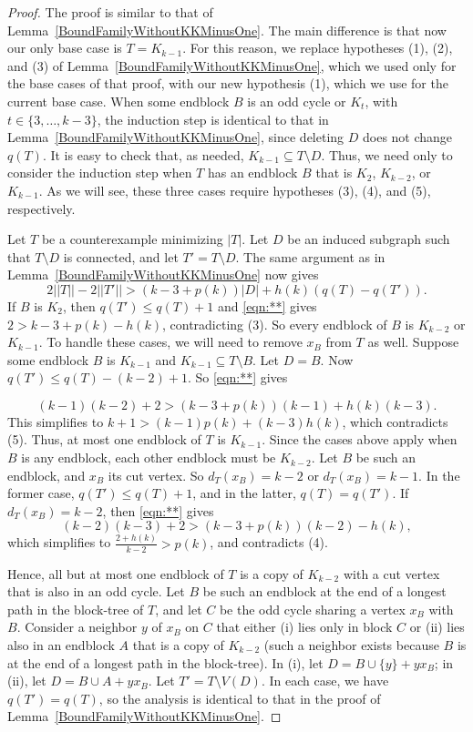\documentclass[12pt]{article}
\theoremstyle{plain}
\theoremstyle{definition}
\theoremstyle{remark}
\newcommand{\card}[1]{\left|#1\right|}
\newcommand{\parens}[1]{\left( #1 \right)}
\begin{document}
\begin{proof}

The proof is similar to that of Lemma~\ref{BoundFamilyWithoutKKMinusOne}.  The
main difference is that now our only base case is $T=K_{k-1}$.  For this
reason, we replace hypotheses (1), (2), and (3) of
Lemma~\ref{BoundFamilyWithoutKKMinusOne}, which we used only for the base cases
of that proof, with our new hypothesis (1), which we use for the current base
case.  When some endblock $B$ is an odd cycle or $K_t$, with $t\in\{3, \ldots,
k-3\}$, the induction step is identical to that in
Lemma~\ref{BoundFamilyWithoutKKMinusOne}, since deleting $D$ does not change
$q(T)$.
It is easy to check that, as needed, $K_{k-1}\subseteq T\setminus D$.  Thus, we
need only to consider the induction step when $T$ has an endblock $B$ that is
$K_2$, $K_{k-2}$, or $K_{k-1}$.  As we will see, these three cases require
hypotheses (3), (4), and (5), respectively.
    
Let $T$ be a counterexample minimizing $|T|$.  Let $D$ be an induced subgraph
such that $T\setminus D$ is connected, and let $T'=T\setminus D$. The same
argument as in Lemma~\ref{BoundFamilyWithoutKKMinusOne} now gives
    \begin{equation}
		2||T||-2||T'|| > (k-3 + p(k))\card{D} + h(k)\parens{q(T) -
q(T')}.\tag{**}\label{eqn:**}
	\end{equation}
If $B$ is $K_2$, then $q(T') \le q(T) + 1$ and \eqref{eqn:**} gives $2 > k-3 +
p(k) - h(k)$, contradicting (3).
So every endblock of $B$ is $K_{k-2}$ or $K_{k-1}$. To handle these cases, we
will need to remove $x_B$ from $T$ as well.  Suppose some endblock $B$ is
$K_{k-1}$ and $K_{k-1} \subseteq T\setminus B$.  Let $D=B$.  Now
$q(T') \le q(T)-(k-2)+1$.  So \eqref{eqn:**} gives
	
\[ (k-1)(k-2)+2 > (k-3+p(k))(k-1)+h(k)(k-3).\]
This simplifies to $k+1 > (k-1)p(k)+(k-3)h(k)$, which contradicts (5).  Thus,
at most one endblock of $T$ is $K_{k-1}$.
Since the cases above apply when $B$ is any endblock, each other endblock must
be $K_{k-2}$.  Let $B$ be such an endblock, and $x_B$ its cut vertex.	So
$d_T(x_{B}) = k - 2$ or $d_T(x_{B}) = k-1$.  In the former case, $q(T') \le
q(T) + 1$, and in the latter, $q(T) = q(T')$.
If $d_T(x_{B}) = k - 2$, then \eqref{eqn:**} gives
\[(k-2)(k-3) +2 > (k-3 + p(k))(k-2) - h(k),\]
which simplifies to $\frac{2+h(k)}{k-2} > p(k)$, and contradicts (4).
	
Hence, all but at most one endblock of $T$ is a copy of $K_{k-2}$ with a
cut vertex that is also in an odd cycle.  Let $B$ be such an endblock 
at the end of a longest path in the block-tree of $T$, and let $C$ be the odd
cycle sharing a vertex $x_B$ with $B$.  Consider a neighbor $y$ 
of $x_B$ on $C$ that either (i) lies only in block $C$ or (ii) lies also in an
endblock $A$ that is a copy of $K_{k-2}$ (such a neighbor exists 
because $B$ is at the end of a longest path in the block-tree).  In (i), let
$D=B\cup\{y\}+yx_B$; in (ii), let $D=B\cup A+yx_B$.  Let $T'=T\setminus
V(D)$.	In each case, we have $q(T')=q(T)$, so the analysis is identical to that
in the proof of Lemma~\ref{BoundFamilyWithoutKKMinusOne}.
\end{proof}
\end{document}
